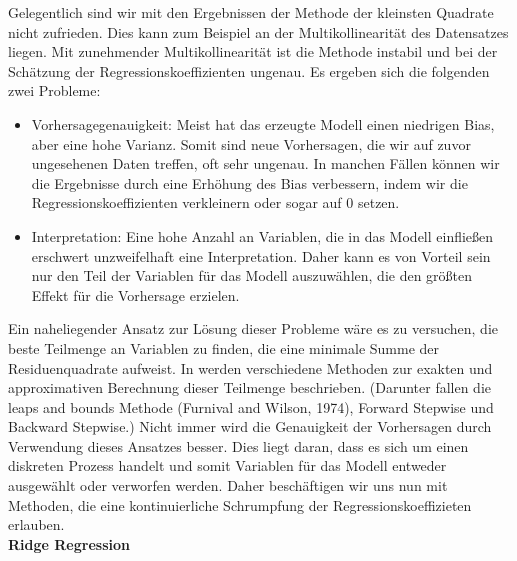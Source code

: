 Gelegentlich sind wir mit den Ergebnissen der Methode der kleinsten Quadrate nicht zufrieden. Dies kann zum Beispiel an der Multikollinearität des Datensatzes liegen. Mit zunehmender Multikollinearität ist die Methode instabil und bei der Schätzung der Regressionskoeffizienten ungenau. Es ergeben sich die folgenden zwei Probleme:
\begin{itemize}
\item Vorhersagegenauigkeit: Meist hat das erzeugte Modell einen niedrigen Bias, aber eine hohe Varianz. Somit sind neue Vorhersagen, die wir auf zuvor ungesehenen Daten treffen, oft sehr ungenau. In manchen Fällen können wir die Ergebnisse durch eine Erhöhung des Bias verbessern, indem wir die Regressionskoeffizienten verkleinern oder sogar auf 0 setzen.
\item Interpretation: Eine hohe Anzahl an Variablen, die in das Modell einfließen erschwert unzweifelhaft eine Interpretation. Daher kann es von Vorteil sein nur den Teil der Variablen für das Modell auszuwählen, die den größten Effekt für die Vorhersage erzielen.
\end{itemize}

Ein naheliegender Ansatz zur Lösung dieser Probleme wäre es zu versuchen, die beste Teilmenge an Variablen zu finden, die eine minimale Summe der Residuenquadrate aufweist. In \cite{hastie_elements} werden verschiedene Methoden zur exakten und approximativen Berechnung dieser Teilmenge beschrieben. (Darunter fallen die leaps and bounds Methode (Furnival and Wilson, 1974), Forward Stepwise und Backward Stepwise.) Nicht immer wird die Genauigkeit der Vorhersagen durch Verwendung dieses Ansatzes besser. Dies liegt daran, dass es sich um einen diskreten Prozess handelt und somit Variablen für das Modell entweder ausgewählt oder verworfen werden. Daher beschäftigen wir uns nun mit Methoden, die eine kontinuierliche Schrumpfung der Regressionskoeffizieten erlauben.\\

\textbf{Ridge Regression}

